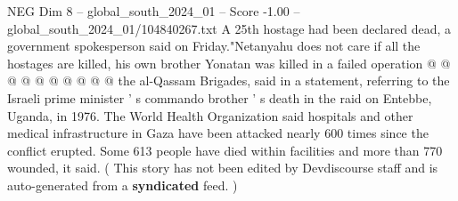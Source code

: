 \begin{textsample}{NEG Dim 8 – global\_south\_2024\_01 – Score -1.00 – global\_south\_2024\_01/104840267.txt}
A 25th hostage had been declared dead, a government spokesperson said on Friday."Netanyahu does not care if all the hostages are killed, his own brother Yonatan was killed in a failed operation @ @ @ @ @ @ @ @ @ @ the al-Qassam Brigades, said in a statement, referring to the Israeli prime minister ' s commando brother ' s death in the raid on Entebbe, Uganda, in 1976.
The World Health Organization said hospitals and other medical infrastructure in Gaza have been attacked nearly 600 times since the conflict erupted.
Some 613 people have died within facilities and more than 770 wounded, it said. ( This story has not been edited by Devdiscourse staff and is auto-generated from a \textbf{syndicated} feed. )

\end{textsample}
